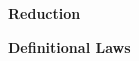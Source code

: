 \documentclass[screen,nonacm]{acmart}
\begin{document}
\begin{figure}[t]
      {\raggedright \vspace{2.0em} \textbf{\Large Reduction} \par}
      \vspace{1.5em}
      \begin{minipage}[t]{0.48\textwidth}
            \raggedright
            \textbf{Definitional Laws}\\
            \vspace{0.5em}
            
            \AExtDefZ{}\\
            \AExtDefS{}\\
            \ACompDef{}\\


\end{minipage}
\end{figure}
\end{document}
